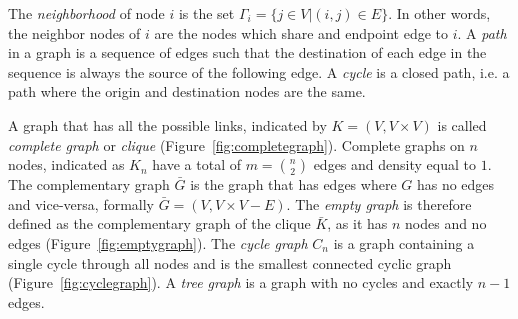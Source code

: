 The \emph{neighborhood} of node $i$ is the set $\Gamma_i=\{j \in V | (i,j) \in E \}$. In other words, the neighbor nodes of $i$ are the nodes which share and endpoint edge to $i$. 
A \emph{path} in a graph is a sequence of edges such that the destination of each edge in the sequence is always the source of the following edge. A \emph{cycle} is a closed path, i.e. a path where the origin and destination nodes are the same.

A graph that has all the possible links, indicated by $K=(V,V\times V)$ is called \emph{complete graph} or \emph{clique} (Figure~\ref{fig:completegraph}). Complete graphs on $n$ nodes, indicated as $K_n$ have a total of $m=\binom{n}{2}$ edges and density equal to $1$.
The complementary graph $\bar{G}$ is the graph that has edges where $G$ has no edges and vice-versa, formally $\bar{G}=(V,V\times V - E)$.
The \emph{empty graph} is therefore defined as the complementary graph of the clique $\bar{K}$, as it has $n$ nodes and no edges (Figure~\ref{fig:emptygraph}). The \emph{cycle graph} $C_n$ is a graph containing a single cycle through all nodes and is the smallest connected cyclic graph (Figure~\ref{fig:cyclegraph}). A \emph{tree graph} is a graph with no cycles and exactly $n-1$ edges.

